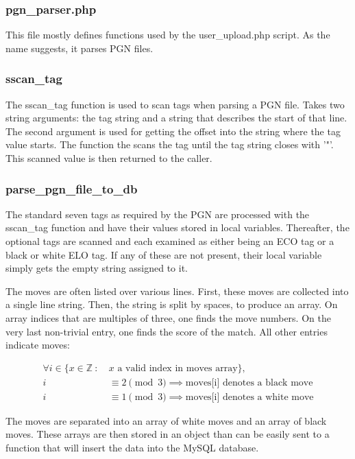 \documentclass{article}
\begin{document}
\subsubsection{pgn\_parser.php}
This file mostly defines functions used by the user\_upload.php script.  As the name suggests, it parses PGN files.  



\subsubsection*{sscan\_tag}
The sscan\_tag function is used to scan tags when parsing a PGN file. Takes two string arguments:  the tag string and a string that describes the start of that line.  The second argument is used for getting the offset into the string where the tag value starts.  The function the scans the tag until the tag string closes with '"'.  This scanned value is then returned to the caller. 


\subsubsection*{parse\_pgn\_file\_to\_db}

The standard seven tags as required by the PGN are processed with the sscan\_tag function and have their values stored in local variables. Thereafter, the optional tags are scanned and each examined as either being an ECO tag or a black or white ELO tag.  If any of these are not present, their local variable simply gets the empty string assigned to it.  

The moves are often listed over various lines.  First, these moves are collected into a single line string.  Then, the string is split by spaces, to produce an array.  On array indices that are multiples of three, one finds the move numbers.  On the very last non-trivial entry, one finds the score of the match.  All other entries indicate moves:  

\begin{align*}
\forall i \in \{ x\in \mathbb{Z}\ :\ & x\text{ a valid index in moves array}\},\\
i & \equiv 2\pmod 3 \implies \text{moves[i] denotes a black move}\\
i & \equiv 1\pmod 3 \implies \text{moves[i] denotes a white move}
\end{align*}

The moves are separated into an array of white moves and an array of black moves. These arrays are then stored in an object than can be easily sent to a function that will insert the data into the MySQL database.
\end{document}

